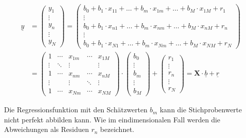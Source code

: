 \begin{equation}\label{eq:thirteenfive}
\begin{split}
\underline{y} & = \left(\begin{array}{c} {y_{1} } \\ {\vdots } \\ {y_{n} } \\ {\vdots } \\ {y_{N} } \end{array}\right)=\left(\begin{array}{c} {b_{0} +b_{1} \cdot x_{11} +\ldots +b_{m} \cdot x_{1m} +\ldots +b_{M} \cdot x_{1M} +r_{1} } \\ {\vdots } \\ {b_{0} +b_{1} \cdot x_{n1} +\ldots +b_{m} \cdot x_{nm} +\ldots +b_{M} \cdot x_{nM} +r_{n} } \\ {\vdots } \\ {b_{0} +b_{1} \cdot x_{N1} +\ldots +b_{m} \cdot x_{Nm} +\ldots +b_{M} \cdot x_{NM} +r_{N} } \end{array}\right) \\ 
& = \left(\begin{array}{ccccc} {1} & {\cdots } & {x_{1m} } & {\cdots } & {x_{1M} } \\ {\vdots } & {\ddots } & {\vdots } & {} & {\vdots } \\ {1} & {\cdots } & {x_{nm} } & {\cdots } & {x_{nM} } \\ {\vdots } & {} & {\vdots } & {\ddots } & {\vdots } \\ {1} & {\cdots } & {x_{Nm} } & {\cdots } & {x_{NM} } \end{array}\right)\cdot \left(\begin{array}{c} {b_{0} } \\ {\vdots } \\ {b_{m} } \\ {\vdots } \\ {b_{M} } \end{array}\right)+\left(\begin{array}{c} {r_{1} } \\ {\vdots } \\ {r_{n} } \\ {\vdots } \\ {r_{N} } \end{array}\right)=\mathbf{X} \cdot \underline{b}+\underline{r}    
\end{split}
\end{equation}

\noindent Die Regressionsfunktion mit den Sch\"{a}tzwerten $b_{m}$ kann die Stichprobenwerte nicht perfekt abbilden kann. Wie im eindimensionalen Fall werden die Abweichungen als Residuen $r_{n}$ bezeichnet.

